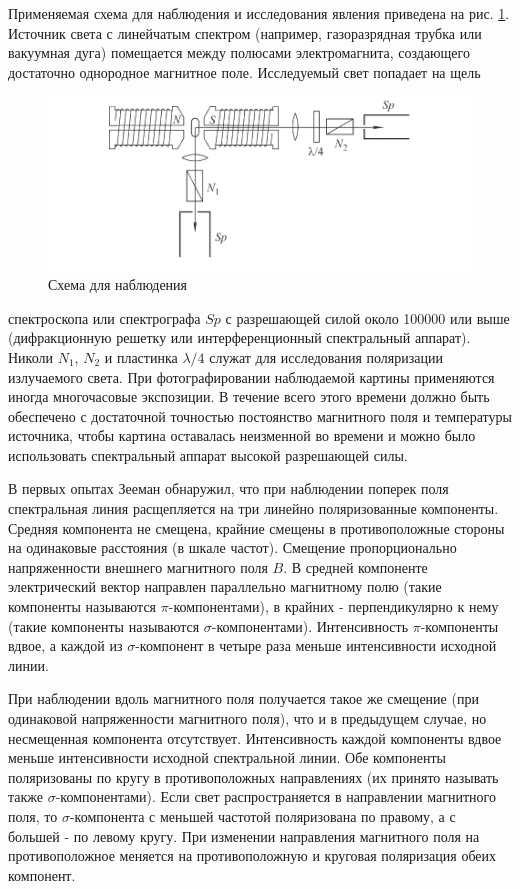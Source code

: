 \documentclass[12pt]{article}
\begin{document}
  Применяемая схема для наблюдения и исследования явления приведена на рис. \ref{fig:scheme}. Источник света с линейчатым спектром (например, газоразрядная трубка или вакуумная дуга) помещается между полюсами электромагнита, создающего достаточно однородное магнитное поле. Исследуемый свет попадает на щель

  \begin{figure}[H]
    \centering
    \includegraphics[width=\textwidth]{scheme.png}
    \caption{Схема для наблюдения}
    \label{fig:scheme}
  \end{figure}
  спектроскопа или спектрографа $Sp$ с разрешающей силой около 100000 или выше (дифракционную решетку или интерференционный спектральный аппарат). Николи $N_1$, $N_2$ и пластинка $\lambda/4$ служат для исследования поляризации излучаемого света. При фотографировании наблюдаемой картины применяются иногда многочасовые экспозиции. В течение всего этого времени должно быть обеспечено с достаточной точностью постоянство магнитного поля и температуры источника, чтобы картина оставалась неизменной во времени и можно было использовать спектральный аппарат высокой разрешающей силы.

  В первых опытах Зееман обнаружил, что при наблюдении поперек поля спектральная линия расщепляется на три линейно поляризованные компоненты. Средняя компонента не смещена, крайние смещены в противоположные стороны на одинаковые расстояния (в шкале частот). Смещение пропорционально напряженности внешнего магнитного поля $B$. В средней компоненте электрический вектор направлен параллельно магнитному полю (такие компоненты называются $\pi$-компонентами), в крайних - перпендикулярно к нему (такие компоненты называются $\sigma$-компонентами). Интенсивность $\pi$-компоненты вдвое, а каждой из $\sigma$-компонент в четыре раза меньше интенсивности исходной линии.

  При наблюдении вдоль магнитного поля получается такое же смещение (при одинаковой напряженности магнитного поля), что и в предыдущем случае, но несмещенная компонента отсутствует. Интенсивность каждой компоненты вдвое меньше интенсивности исходной спектральной линии. Обе компоненты поляризованы по кругу в противоположных направлениях (их принято называть также $\sigma$-компонентами). Если свет распространяется в направлении магнитного поля, то $\sigma$-компонента с меньшей частотой поляризована по правому, а с большей - по левому кругу. При изменении направления магнитного поля на противоположное меняется на противоположную и круговая поляризация обеих компонент.
\end{document}
